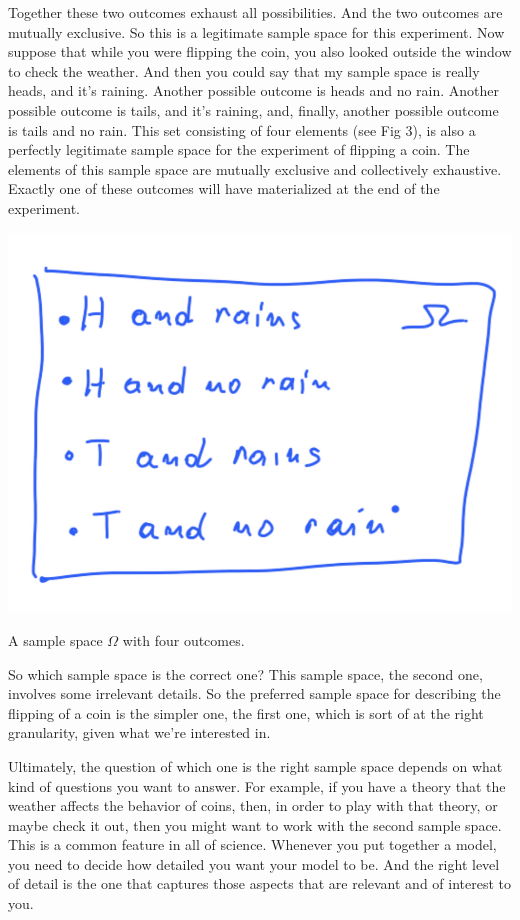 \documentclass{tufte-handout}
\begin{document}
Together these two outcomes exhaust all possibilities. And the two outcomes are mutually exclusive. So
this is a legitimate sample space for this experiment. Now suppose that while you were flipping the
coin, you also looked outside the window to check the weather. And then you could say that my sample
space is really heads, and it's raining. Another possible outcome is heads and no rain. Another
possible outcome is tails, and it's raining, and, finally, another possible outcome is tails and no rain.
This set consisting of four elements (see Fig 3), is also a perfectly legitimate sample space for the experiment of
flipping a coin. The elements of this sample space are mutually exclusive and collectively exhaustive.
Exactly one of these outcomes will have materialized at the end of the
experiment.
\begin{marginfigure}
  \includegraphics[width=\linewidth]{HeadsTailsRain}
  \caption{A sample space $\Omega$ with four outcomes.}
  \label{fig:marginfig}
\end{marginfigure}
So which sample space is the correct one? This sample space, the second one, involves some
irrelevant details. So the preferred sample space for describing the flipping of a coin is the 
simpler one, the first one, which is sort of at the right granularity, given what we're
interested in.

Ultimately, the question of which one is the right sample space depends on what kind of questions
you want to answer. For example, if you have a theory that the weather affects the behavior of coins,
then, in order to play with that theory, or maybe check it out, then you might
want to work with the second sample space.
This is a common feature in all of science. Whenever you put together a model, you need to decide
how detailed you want your model to be. And the right level of detail is the one that captures those
aspects that are relevant and of interest to you.
\end{document}
